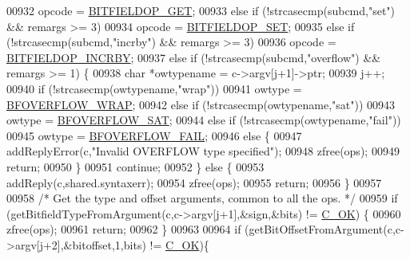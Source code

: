 \begin{DoxyCode}
{00932             opcode = \hyperlink{bitops_8c_abb0e64d988f71e146be3778564d90e5f}{BITFIELDOP\_GET};
00933         \textcolor{keywordflow}{else} \textcolor{keywordflow}{if} (!strcasecmp(subcmd,\textcolor{stringliteral}{"set"}) && remargs >= 3)
00934             opcode = \hyperlink{bitops_8c_a00d14d842300bc8ec501a5e1996c515f}{BITFIELDOP\_SET};
00935         \textcolor{keywordflow}{else} \textcolor{keywordflow}{if} (!strcasecmp(subcmd,\textcolor{stringliteral}{"incrby"}) && remargs >= 3)
00936             opcode = \hyperlink{bitops_8c_aa91cdbb6feffa6f3ef145e62f0fb7706}{BITFIELDOP\_INCRBY};
00937         \textcolor{keywordflow}{else} \textcolor{keywordflow}{if} (!strcasecmp(subcmd,\textcolor{stringliteral}{"overflow"}) && remargs >= 1) \{
00938             \textcolor{keywordtype}{char} *owtypename = c->argv[j+1]->ptr;
00939             j++;
00940             \textcolor{keywordflow}{if} (!strcasecmp(owtypename,\textcolor{stringliteral}{"wrap"}))
00941                 owtype = \hyperlink{bitops_8c_a4ecdfa50fecb0c7c8f11f098d9b808e8}{BFOVERFLOW\_WRAP};
00942             \textcolor{keywordflow}{else} \textcolor{keywordflow}{if} (!strcasecmp(owtypename,\textcolor{stringliteral}{"sat"}))
00943                 owtype = \hyperlink{bitops_8c_abe656810f7c24542b4451c96b960cae1}{BFOVERFLOW\_SAT};
00944             \textcolor{keywordflow}{else} \textcolor{keywordflow}{if} (!strcasecmp(owtypename,\textcolor{stringliteral}{"fail"}))
00945                 owtype = \hyperlink{bitops_8c_a43973854211e7721d528708f55214302}{BFOVERFLOW\_FAIL};
00946             \textcolor{keywordflow}{else} \{
00947                 addReplyError(c,\textcolor{stringliteral}{"Invalid OVERFLOW type specified"});
00948                 zfree(ops);
00949                 \textcolor{keywordflow}{return};
00950             \}
00951             \textcolor{keywordflow}{continue};
00952         \} \textcolor{keywordflow}{else} \{
00953             addReply(c,shared.syntaxerr);
00954             zfree(ops);
00955             \textcolor{keywordflow}{return};
00956         \}
00957 
00958         \textcolor{comment}{/* Get the type and offset arguments, common to all the ops. */}
00959         \textcolor{keywordflow}{if} (getBitfieldTypeFromArgument(c,c->argv[j+1],&sign,&bits) != \hyperlink{server_8h_a303769ef1065076e68731584e758d3e1}{C\_OK}) \{
00960             zfree(ops);
00961             \textcolor{keywordflow}{return};
00962         \}
00963 
00964         \textcolor{keywordflow}{if} (getBitOffsetFromArgument(c,c->argv[j+2],&bitoffset,1,bits) != 
      \hyperlink{server_8h_a303769ef1065076e68731584e758d3e1}{C\_OK})\{
}
\end{DoxyCode}
